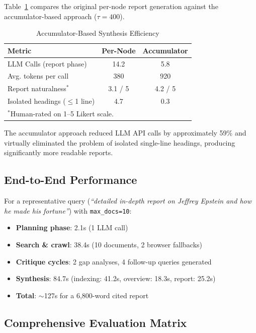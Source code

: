 \documentclass[conference]{IEEEtran}
\begin{document}
Table~\ref{tab:accumulator} compares the original per-node report generation against the accumulator-based approach ($\tau = 400$).

\begin{table}[htbp]
\caption{Accumulator-Based Synthesis Efficiency}
\label{tab:accumulator}
\centering
\scriptsize
\begin{tabular}{@{}lcc@{}}
\toprule
\textbf{Metric} & \textbf{Per-Node} & \textbf{Accumulator} \\
\midrule
LLM Calls (report phase) & 14.2 & 5.8 \\
Avg. tokens per call & 380 & 920 \\
Report naturalness$^*$ & 3.1 / 5 & 4.2 / 5 \\
Isolated headings ($\leq$1 line) & 4.7 & 0.3 \\
\bottomrule
\multicolumn{3}{l}{\scriptsize $^*$Human-rated on 1--5 Likert scale.}
\end{tabular}
\end{table}

The accumulator approach reduced LLM API calls by approximately 59\% and virtually eliminated the problem of isolated single-line headings, producing significantly more readable reports.

\subsection{End-to-End Performance}

For a representative query (\textit{``detailed in-depth report on Jeffrey Epstein and how he made his fortune''}) with \texttt{max\_docs=10}:

\begin{itemize}
    \item \textbf{Planning phase}: 2.1s (1 LLM call)
    \item \textbf{Search \& crawl}: 38.4s (10 documents, 2 browser fallbacks)
    \item \textbf{Critique cycles}: 2 gap analyses, 4 follow-up queries generated
    \item \textbf{Synthesis}: 84.7s (indexing: 41.2s, overview: 18.3s, report: 25.2s)
    \item \textbf{Total}: $\sim$127s for a 6,800-word cited report
\end{itemize}

\subsection{Comprehensive Evaluation Matrix}
\end{document}
